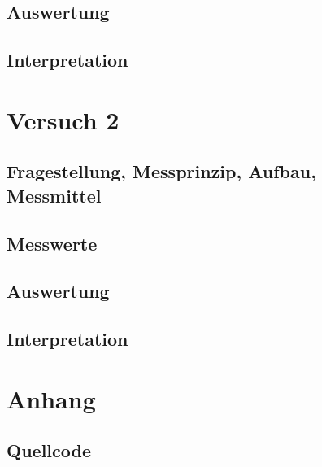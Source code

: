 \documentclass[12pt, oneside, a4paper, \docLanguage]{report}
\begin{document}
\section{Auswertung}
\label{chap:VERSUCH_1_AUSWERTUNG}

\section{Interpretation}
\label{chap:VERSUCH_1_INTERPRETATION}

%
%
\chapter{Versuch 2}
\label{chap:VERSUCH_2}

\section{Fragestellung, Messprinzip, Aufbau, Messmittel}
\label{chap:VERSUCH_2_FRAGESTELLUNG}

\section{Messwerte}
\label{chap:VERSUCH_2_MESSWERTE}

\section{Auswertung}
\label{chap:VERSUCH_2_AUSWERTUNG}

\section{Interpretation}
\label{chap:VERSUCH_2_INTERPRETATION}

%
%
\renewcommand\thesection{A.\arabic{section}}
\renewcommand\thesubsection{\thesection.\arabic{subsection}}

\chapter*{Anhang}
\label{chap:APPENDIX}
\addtocounter{chapter}{1}
\setcounter{section}{0}

\section{Quellcode}
\label{chap:APPENDIX_SOURCECODE}
\end{document}
